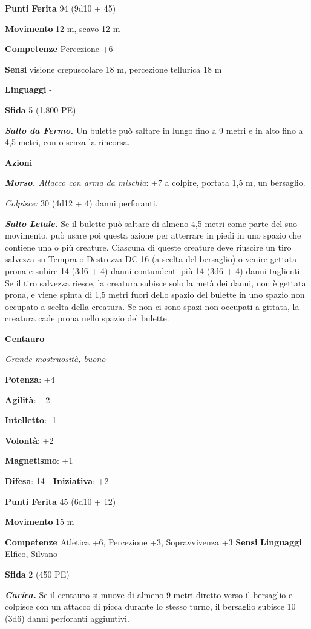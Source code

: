 \begin{multicols}{2}
\textbf{Punti Ferita} 94 (9d10 + 45)

\textbf{Movimento} 12 m, scavo 12 m

\textbf{Competenze} Percezione +6

\textbf{Sensi} visione crepuscolare 18 m, percezione tellurica 18 m

\textbf{Linguaggi} -

\textbf{Sfida} 5 (1.800 PE)

\emph{\textbf{Salto da Fermo.}} Un bulette può saltare in lungo fino a 9
metri e in alto fino a 4,5 metri, con o senza la rincorsa.

\textbf{Azioni}

\emph{\textbf{Morso.} Attacco con arma da mischia}: +7 a colpire,
portata 1,5 m, un bersaglio.

\emph{Colpisce:} 30 (4d12 + 4) danni perforanti.

\emph{\textbf{Salto Letale.}} Se il bulette può saltare di almeno 4,5
metri come parte del suo movimento, può usare poi questa azione per
atterrare in piedi in uno spazio che contiene una o più creature.
Ciascuna di queste creature deve riuscire un tiro salvezza su Tempra o
Destrezza DC 16 (a scelta del bersaglio) o venire gettata prona e subire
14 (3d6 + 4) danni contundenti più 14 (3d6 + 4) danni taglienti. Se il
tiro salvezza riesce, la creatura subisce solo la metà dei danni, non è
gettata prona, e viene spinta di 1,5 metri fuori dello spazio del
bulette in uno spazio non occupato a scelta della creatura. Se non ci
sono spazi non occupati a gittata, la creatura cade prona nello spazio
del bulette.

\textbf{Centauro}

\emph{Grande mostruosità, buono}

\textbf{Potenza}: +4

\textbf{Agilità}: +2

\textbf{Intelletto}: -1

\textbf{Volontà}: +2

\textbf{Magnetismo}: +1

\textbf{Difesa}: 14 - \textbf{Iniziativa}: +2

\textbf{Punti Ferita} 45 (6d10 + 12)

\textbf{Movimento} 15 m

\textbf{Competenze} Atletica +6, Percezione +3, Sopravvivenza +3
\textbf{Sensi}  \textbf{Linguaggi} Elfico, Silvano

\textbf{Sfida} 2 (450 PE)

\emph{\textbf{Carica.}} Se il centauro si muove di almeno 9 metri
diretto verso il bersaglio e colpisce con un attacco di picca durante lo
stesso turno, il bersaglio subisce 10 (3d6) danni perforanti aggiuntivi.


\end{multicols}
